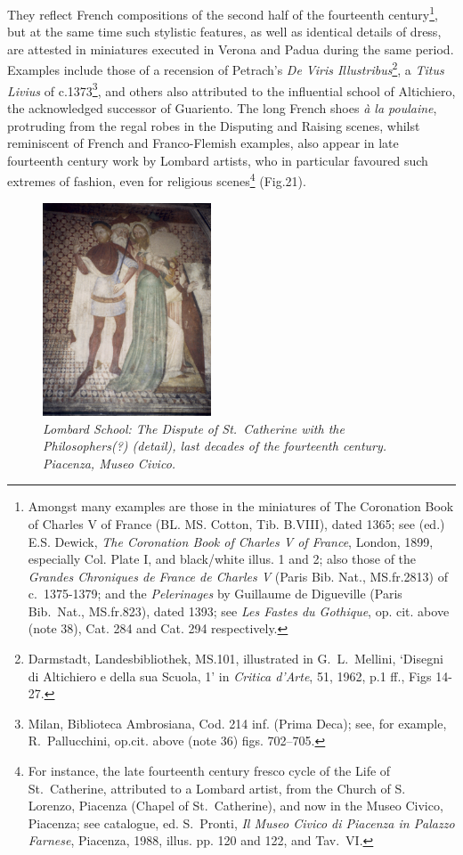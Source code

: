 \documentclass[a4paper,12pt]{article}
\begin{document}
They reflect French compositions of the second half of the fourteenth
century\footnote{Amongst many examples are those in the miniatures of
The Coronation Book of Charles V of France (BL. MS. Cotton,
Tib. B.VIII), dated 1365; see (ed.) E.S. Dewick, \textit{The
Coronation Book of Charles V of France}, London, 1899, especially
Col. Plate I, and black/white illus. 1 and 2; also those of the
\textit{Grandes Chroniques de France de Charles V} (Paris Bib. Nat.,
MS.fr.2813) of c.~1375-1379; and the \textit{Pelerinages} by Guillaume
de Digueville (Paris Bib.~Nat., MS.fr.823), dated 1393; see \textit{Les
Fastes du Gothique}, op. cit. above (note 38), Cat. 284 and Cat. 294
respectively.}, but at the same time such stylistic features, as well
as identical details of dress, are attested in miniatures executed in
Verona and Padua during the same period. Examples include those of a
recension of Petrach's \textit{De Viris
Illustribus}\footnote{Darmstadt, Landesbibliothek, MS.101, illustrated
in G.~L.~Mellini, `Disegni di Altichiero e della sua Scuola, 1' in
\textit{Critica d'Arte}, 51, 1962, p.1 ff., Figs 14-27.}, a
\textit{Titus Livius} of c.1373\footnote{Milan, Biblioteca Ambrosiana,
Cod. 214 inf. (Prima Deca); see, for example, R.~Pallucchini,
op.cit. above (note 36) figs. 702--705.}, and others also attributed
to the influential school of Altichiero, the acknowledged successor of
Guariento. The long French shoes \textit{\`a la poulaine}, protruding
from the regal robes in the Disputing and Raising scenes, whilst
reminiscent of French and Franco-Flemish examples, also appear in late
fourteenth century work by Lombard artists, who in particular favoured
such extremes of fashion, even for religious scenes\footnote{For
instance, the late fourteenth century fresco cycle of the Life of
St.~Catherine, attributed to a Lombard artist, from the Church of
S. Lorenzo, Piacenza (Chapel of St.~Catherine), and now in the Museo
Civico, Piacenza; see catalogue, ed. S.~Pronti, \textit{Il Museo Civico
di Piacenza in Palazzo Farnese}, Piacenza, 1988, illus. pp. 120 and
122, and Tav.~VI.} (Fig.21).
\begin{figure}[htbp]
\centering
\includegraphics[width=5cm]{pics/fig21.png}
\caption[Lombard School: The Dispute of St.~Catherine with the Philosophers(?)
(detail)] 
{\it Lombard School: The Dispute of St.~Catherine with the Philosophers(?)
(detail), last decades of the fourteenth century.  Piacenza, Museo
Civico.}
\end{figure}
\end{document}

